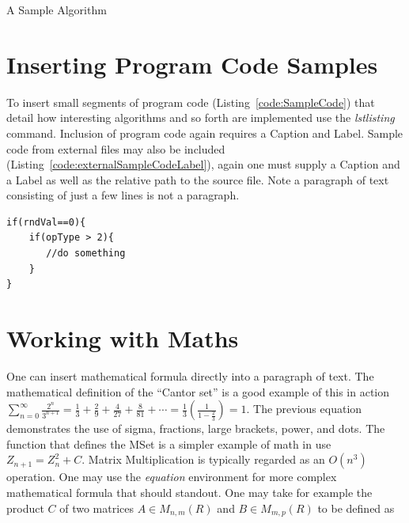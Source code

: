 \begin{algorithm}
{}
\caption{A Sample Algorithm} \label{alg:using:SampleAlgorithm}
\end{algorithm}

\section{Inserting Program Code Samples}

To insert small segments of program code (Listing~\ref{code:SampleCode}) that detail how interesting algorithms and so forth are implemented use the \emph{lstlisting} command. Inclusion of program code again requires a Caption and Label. Sample code from external files may also be included (Listing~\ref{code:externalSampleCodeLabel}), again one must supply a Caption and a Label as well as the relative path to the source file. Note a paragraph of text consisting of just a few lines is not a paragraph.



\begin{lstlisting}[caption=Sample Program Code Listing, label=code:SampleCode]
if(rndVal==0){
    if(opType > 2){
       //do something
    }
}
\end{lstlisting}


\section{Working with Maths}
One can insert mathematical formula directly into a paragraph of text. The mathematical definition of the ``Cantor set'' is a good example of this in action
$\displaystyle\sum_{n=0}^\infty \frac{2^n}{3^{n+1}} = \frac{1}{3} +
\frac{2}{9} + \frac{4}{27} + \frac{8}{81} + \cdots =
\frac{1}{3}\left(\frac{1}{1-\frac{2}{3}}\right) = 1$. The previous equation demonstrates the use of sigma, fractions, large brackets, power, and dots. The function that defines the MSet is a simpler example of math in use $Z_{n+1} =
Z_{n}^2 + C$. Matrix Multiplication is typically regarded as an $O(n^3)$
operation. One may use the \emph{equation} environment for more complex mathematical formula that should standout. One may take for example the product  $C$ of two matrices $A \in M_{n,m}(R)$ and $B \in
M_{m,p}(R)$ to be defined as

